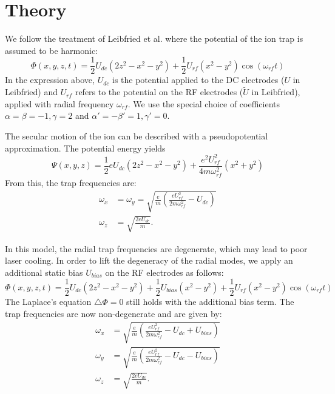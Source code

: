 \documentclass[a4paper,10pt]{article}
\begin{document}
\section{Theory}

We follow the treatment of Leibfried et al. where the potential of the ion trap is assumed to be harmonic:
\begin{equation}
 \Phi(x,y,z,t) = \frac{1}{2} U_{dc}(2z^2 - x^2 - y^2) + \frac{1}{2}U_{rf}(x^2 - y^2)\cos (\omega_{rf} t)
\end{equation}
In the expression above, $U_{dc}$ is the potential applied to the DC electrodes ($U$ in Leibfried) and $U_{rf}$ refers to the potential on the RF electrodes ($\tilde{U}$ in Leibfried), applied with radial frequency $\omega_{rf}$. We use the special choice of coefficients $\alpha=\beta=-1, \gamma=2$ and $\alpha'=-\beta'=1, \gamma'=0$.

The secular motion of the ion can be described with a pseudopotential approximation. The potential energy yields
\begin{equation}
 \Psi(x,y,z) =  \frac{1}{2}eU_{dc}(2z^2 - x^2 - y^2) + \frac{e^2U_{rf}^2}{4 m \omega_{rf}^2} (x^2 + y^2)
\end{equation}
From this, the trap frequencies are:
\begin{align}
 \omega_x &= \omega_y = \sqrt{\frac{e}{m}\left(\frac{e U_{rf}^2}{2m\omega_{rf}^2}-U_{dc} \right)}\\
 \omega_z &= \sqrt{\frac{2eU_{dc}}{m}}.
\end{align}

In this model, the radial trap frequencies are degenerate, which may lead to poor laser cooling. In order to lift the degeneracy of the radial modes, we
apply an additional static bias $U_{bias}$ on the RF electrodes as follows:
\begin{equation}
 \Phi(x,y,z,t) = \frac{1}{2} U_{dc}(2z^2 - x^2 - y^2) + \frac{1}{2}U_{bias}(x^2 - y^2) + \frac{1}{2}U_{rf}(x^2 - y^2)\cos (\omega_{rf} t)
\end{equation}
The Laplace's equation $\triangle\Phi= 0$ still holds with the additional bias term. The trap frequencies are now non-degenerate and are given by:
\begin{align}
 \omega_x &= \sqrt{\frac{e}{m}\left(\frac{e U_{rf}^2}{2m\omega_{rf}^2}-U_{dc} +U_{bias}\right)}\\
 \omega_y &= \sqrt{\frac{e}{m}\left(\frac{e U_{rf}^2}{2m\omega_{rf}^2}-U_{dc} -U_{bias}\right)}\\
 \omega_z &= \sqrt{\frac{2eU_{dc}}{m}}.
\end{align}
\end{document}
